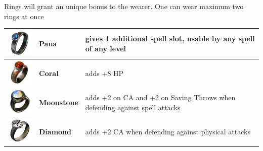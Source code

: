 Rings will grant an unique bonus to the wearer. One can wear maximum two rings at once \\

\begin{tabular}{m{2cm}m{3cm}m{5cm} } \hline
	\includegraphics[width=2cm]{../Pictures/Gameplay/Items/Wearables/Rings/Paua_ring_icon.png} & \textbf{Paua} & gives 1 additional spell slot, usable by any spell of any level \\ \hline
	\includegraphics[width=2cm]{../Pictures/Gameplay/Items/Wearables/Rings/Coral_ring_icon.png} & \textbf{Coral} & adds +8 HP \\ \hline
	\includegraphics[width=2cm]{../Pictures/Gameplay/Items/Wearables/Rings/Moonstone_ring_icon.png} & \textbf{Moonstone} & adds +2 on CA and +2 on Saving Throws when defending against spell attacks \\ \hline
	\includegraphics[width=2cm]{../Pictures/Gameplay/Items/Wearables/Rings/Diamond_ring_icon.png} & \textbf{Diamond} & adds +2 CA when defending against physical attacks \\ \hline
\end{tabular}

\pagebreak 